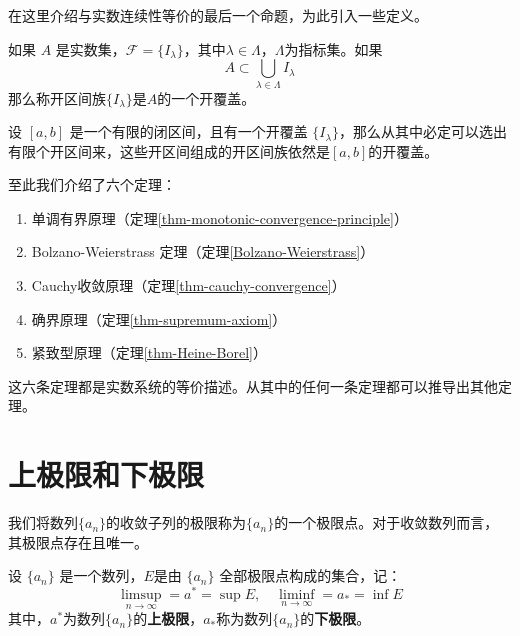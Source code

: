 在这里介绍与实数连续性等价的最后一个命题，为此引入一些定义。

\begin{definition}[开覆盖]
	如果 $A$ 是实数集，$\mathcal F = \{I_\lambda\}$，其中$\lambda \in \Lambda$，$\Lambda$为指标集。如果
	$$
		A\subset \bigcup_{\lambda \in \Lambda} I_\lambda
	$$
	那么称开区间族$\{I_\lambda\}$是$A$的一个开覆盖。
\end{definition}


\begin{theorem}[紧致性定理]\label{thm-Heine-Borel}
	设 $[a,b]$ 是一个有限的闭区间，且有一个开覆盖 $\{I_\lambda\}$，那么从其中必定可以选出有限个开区间来，这些开区间组成的开区间族依然是$[a,b]$的开覆盖。
\end{theorem}


至此我们介绍了六个定理：

\begin{enumerate}
	\item 单调有界原理（定理\ref{thm-monotonic-convergence-principle}）
	\item Bolzano-Weierstrass 定理（定理\ref{Bolzano-Weierstrass}）
	\item Cauchy收敛原理（定理\ref{thm-cauchy-convergence}）
	\item 确界原理（定理\ref{thm-supremum-axiom}）
	\item 紧致型原理（定理\ref{thm-Heine-Borel}）
\end{enumerate}

这六条定理都是实数系统的等价描述。从其中的任何一条定理都可以推导出其他定理。


\section{上极限和下极限}

我们将数列$\{a_n\}$的收敛子列的极限称为$\{a_n\}$的一个极限点。对于收敛数列而言，其极限点存在且唯一。

\begin{definition}\label{def-uplim}
	设 $\{a_n\}$ 是一个数列，$E$是由 $\{a_n\}$ 全部极限点构成的集合，记：
	$$
	\limsup_{n\rightarrow \infty}=a^*=\sup E,\quad \liminf_{n\rightarrow \infty}=a_*=\inf E
	$$
	其中，$a^*$为数列$\{a_n\}$的\textbf{上极限}，$a_*$称为数列$\{a_n\}$的\textbf{下极限}。
\end{definition}

